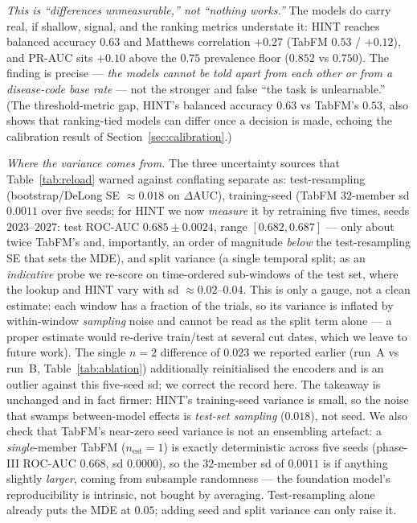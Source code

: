 \documentclass[a4paper,fleqn]{cas-sc}
\begin{document}
\emph{This is ``differences unmeasurable,'' not ``nothing works.''} The models do carry real,
if shallow, signal, and the ranking metrics understate it: HINT reaches balanced accuracy
$0.63$ and Matthews correlation $+0.27$ (TabFM $0.53$ / $+0.12$), and PR-AUC sits $+0.10$ above
the $0.75$ prevalence floor ($0.852$ vs $0.750$). The finding is precise --- \emph{the models
cannot be told apart from each other or from a disease-code base rate} --- not the stronger and
false ``the task is unlearnable.'' (The threshold-metric gap, HINT's balanced accuracy $0.63$
vs TabFM's $0.53$, also shows that ranking-tied models can differ once a decision is made,
echoing the calibration result of Section~\ref{sec:calibration}.)

\emph{Where the variance comes from.} The three uncertainty sources that Table~\ref{tab:reload}
warned against conflating separate as: test-resampling (bootstrap/DeLong SE $\approx0.018$ on
$\Delta$AUC), training-seed (TabFM $32$-member sd $0.0011$ over five seeds; for HINT we now
\emph{measure} it by retraining five times, seeds $2023$--$2027$: test ROC-AUC $0.685\pm0.0024$,
range $[0.682,0.687]$ --- only about twice TabFM's and, importantly, an order of magnitude
\emph{below} the test-resampling SE that sets the MDE), and split variance (a single temporal
split; as an \emph{indicative} probe we re-score on time-ordered sub-windows of the test set,
where the lookup and HINT vary with sd $\approx0.02$--$0.04$. This is only a gauge, not a clean
estimate: each window has a fraction of the trials, so its variance is inflated by within-window
\emph{sampling} noise and cannot be read as the split term alone --- a proper estimate would
re-derive train/test at several cut dates, which we leave to future work). The single $n{=}2$ difference of
$0.023$ we reported earlier (run~A vs run~B, Table~\ref{tab:ablation}) additionally reinitialised
the encoders and is an outlier against this five-seed sd; we correct the record here. The
takeaway is unchanged and in fact firmer: HINT's training-seed variance is small, so the noise
that swamps between-model effects is \emph{test-set sampling} ($0.018$), not seed. We also check that TabFM's near-zero seed variance is not an
ensembling artefact: a \emph{single}-member TabFM ($n_{\text{est}}{=}1$) is exactly
deterministic across five seeds (phase-III ROC-AUC $0.668$, sd $0.0000$), so the $32$-member
sd of $0.0011$ is if anything slightly \emph{larger}, coming from subsample randomness --- the
foundation model's reproducibility is intrinsic, not bought by averaging. Test-resampling alone
already puts the MDE at $0.05$; adding seed and split variance can only raise it.
\end{document}
